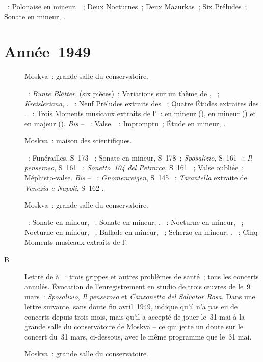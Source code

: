 \begin{description}
 \textsc{\Chopin{}}~: Polonaise en \kC \Sharp mineur,  ~;
 Deux Nocturnes~; Deux Mazurkas~; Six Préludes~; Sonate en \kB \Flat mineur,
 .
\end{description}

\section{Année~1949}

\begin{description}
 \item[]
 Moskva~: grande salle du conservatoire.

 \textsc{\Schumann{}}~: \emph{Bunte Blätter},  (six pièces)~;
 Variations sur un thème de \CWieck{}, ~;
 \emph{Kreisleriana}, .
 \textsc{\Scriabine{}}~: Neuf Préludes extraits des ~; Quatre Études extraites des .
 \textsc{\Rachmaninov{}}~: Trois Moments musicaux extraits de l'~:
 en \kE \Flat mineur (), en \kE mineur () et en \kC
 majeur ().
 \emph{Bis} -- \textsc{\Rachmaninov{}}~: Valse.
 \textsc{\Scriabine{}}~: Impromptu~; Étude en \kD \Sharp mineur, 
 .
 \item[]
 Moskva~: maison des scientifiques.

 \textsc{\Liszt{}}~: Funérailles, S~173 ~; Sonate en \kB mineur,
 S~178~; \emph{Sposalizio}, S~161 ~; \emph{Il penseroso}, S~161
 ~; \emph{Sonetto~104 del Petrarca}, S~161 ~; Valse
 oubliée~; Méphisto-valse.
 \emph{Bis} -- \textsc{\Liszt{}}~: \emph{Gnomenreigen}, S~145 ~;
 \emph{Tarantella} extraite de \emph{Venezia e Napoli}, S~162 .
 \item[]
 Moskva~: grande salle du conservatoire.

 \textsc{\Beethoven{}}~: Sonate en \kF mineur, ~; Sonate en \kC
 \Sharp mineur,  .
 \textsc{\Chopin{}}~: Nocturne en \kC mineur,  ~;
 Nocturne en \kG mineur,  ~; Ballade en \kG mineur,
 ~; Scherzo en \kB mineur, .
 \textsc{\Rachmaninov{}}~: Cinq Moments musicaux extraits de l'.
 \item[B]
 Lettre de \VSofronitsky{} à \AVizel{} \citep[p.~169]{Nekrasova08}~: trois
 grippes et autres problèmes de santé~; tous les concerts annulés.
 Évocation de l'enregistrement en studio de trois œuvres de \Liszt{} le~9
 mars~: \emph{Sposalizio}, \emph{Il penseroso} et \emph{Canzonetta del
 Salvator Rosa}.
 Dans une lettre suivante, sans doute fin avril~1949, \Sofronitsky{} indique
 qu'il n'a pas eu de concerts depuis trois mois, mais qu'il a accepté de
 jouer le~31 mai à la grande salle du conservatoire de Moskva
 \citep[p.~169-170]{Nekrasova08} -- ce qui jette un doute sur le concert
 du~31 mars, ci-dessous, avec le même programme que le~31 mai.
 \item[]
 Moskva~: grande salle du conservatoire.


\end{description}
